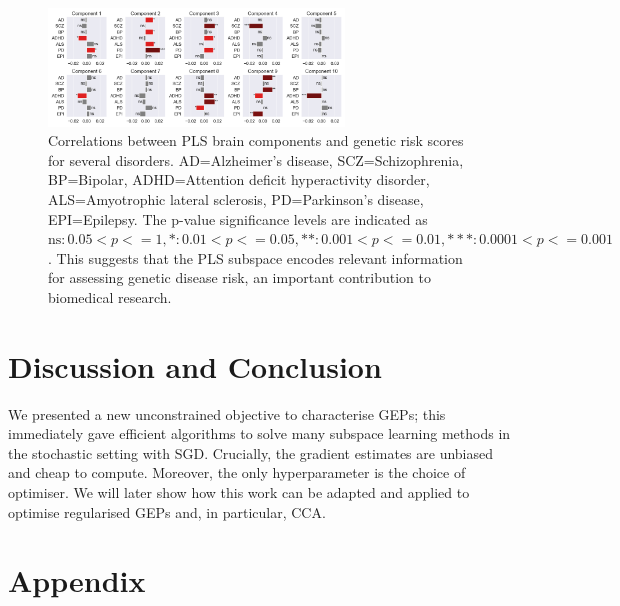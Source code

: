 \begin{figure}
    \centering
    \includegraphics[width=0.7\textwidth,trim={0.5cm 0cm 0.7cm 0cm}]{figures/gradient_descent/UKBB/prs_correlations}
    \caption{Correlations between PLS brain components and genetic risk scores for several disorders. AD=Alzheimer's disease, SCZ=Schizophrenia, BP=Bipolar, ADHD=Attention deficit hyperactivity disorder, ALS=Amyotrophic lateral sclerosis, PD=Parkinson's disease, EPI=Epilepsy. The p-value significance levels are indicated as $\text{ns}: 0.05< p <= 1, \ast: 0.01< p <=0.05, \ast\ast: 0.001< p <= 0.01, \ast\ast\ast: 0.0001< p <= 0.001$. This suggests that the PLS subspace encodes relevant information for assessing genetic disease risk, an important contribution to biomedical research.}
    \label{fig:genetic_risk}
\end{figure}


\section{Discussion and Conclusion}

We presented a new unconstrained objective to characterise GEPs; this immediately gave efficient algorithms to solve many subspace learning methods in the stochastic setting with SGD.
Crucially, the gradient estimates are unbiased and cheap to compute.
Moreover, the only hyperparameter is the choice of optimiser.
We will later show how this work can be adapted and applied to optimise regularised GEPs and, in particular, CCA.

\appendix

\section{Appendix}